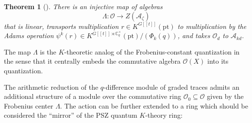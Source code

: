 \documentclass[reqno]{amsart}
\numberwithin{equation}{section}
\numberwithin{equation}{section}
\numberwithin{equation}{section}
\newtheorem{thm}{Theorem}[section]
\theoremstyle{definition}
\theoremstyle{remark}
\theoremstyle{remark}
\begin{document}
\begin{thm}[{\cite[Theorem 4.1]{lonergan}}]
    There is an injective map of algebras
    \begin{equation}
        \Lambda : \mathcal{O} \to Z (\mathcal{A}_\zeta)
    \end{equation}
    that is linear, transports multiplication $r \in K^{G[\![t]\!]}(\mathrm{pt})$ to multiplication by the Adams operation $\psi^k(r) \in K^{G[\![t]\!] \rtimes \mathbb{C}^\times_q}(\mathrm{pt})/(\Phi_k(q))$, and takes $\mathcal{O}_d$ to $\mathcal{A}_{kd}$.
\end{thm}
The map $\Lambda$ is the $K$-theoretic analog of the Frobenius-constant quantization in the sense that it centrally embeds the commutative algebra $\mathcal{O}(X)$ into its quantization.

The arithmetic reduction of the $q$-difference module of graded traces admits an additional structure of a module over the commutative ring $\mathcal{O}_0 \subseteq \mathcal{O}$ given by the Frobenius center $\Lambda$. The action can be further extended to a ring which should be considered the ``mirror'' of the PSZ quantum $K$-theory ring:
\end{document}
